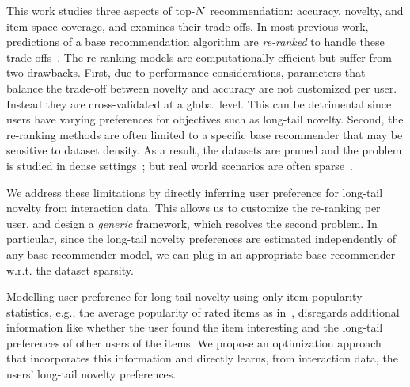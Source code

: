 This work studies three aspects of top-$N$ recommendation: accuracy, novelty, and item space coverage, and examines their trade-offs. In most previous work, predictions of a base recommendation algorithm are \textit{re-ranked} to handle these trade-offs~\cite{adomavicius2012improving,jambor2010optimizing,zhang2013personalize,wang2009portfolio}. The re-ranking models are computationally efficient but suffer from two drawbacks. First, due to performance considerations,  parameters that balance the trade-off between novelty and accuracy  are not customized per user. Instead they are cross-validated at a global level.  This can be detrimental since users have varying preferences for  objectives such as long-tail novelty. Second,  the re-ranking methods are often limited to a specific base recommender  that may be sensitive to dataset density. 
As a result, the datasets are pruned and the problem is studied in dense settings~\cite{adomavicius2012improving,ho2014likes}; but real world  scenarios are often sparse~\cite{kanagal2012supercharging,liu2017experimental}.   

\iffalse
We address these limitations by directly inferring  user  preference for long-tail novelty  from interaction data.  This  allows us to customize the re-ranking  per user, and design a \textit{generic} framework, which resolves the second problem. In particular, since the long-tail novelty preferences are estimated independently of any base  recommender model, we can  plug-in an appropriate base recommender w.r.t. the dataset sparsity.%

Modelling  user  preference for  long-tail novelty using only item popularity statistics, e.g., the average popularity of rated items as in~\cite{jugovac2017efficient}, disregards additional information like whether the user found the item interesting and the long-tail preferences of other users  of the items. \iffalse To incorporate them, we introduce the notion of  \emph{item long-tail importance}. Both  user long-tail preferences and item long-tail importance are dependent:  a user has high preference for discovering long-tail items if she is interested in important long-tail items, and an item that is associated with many of these kinds of users is likely to be more important.  We propose a joint optimization framework to directly learn,  from interaction data, both the users' long-tail preferences and the  items' long-tail importance. \fi
We propose an optimization approach that  incorporates  this information and  directly learns,  from interaction data, the users' long-tail novelty preferences.


